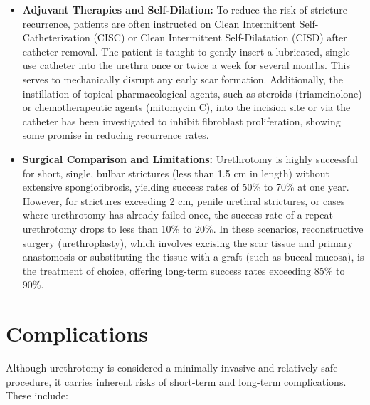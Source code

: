 \begin{itemize}
  \item \textbf{Adjuvant Therapies and Self-Dilation:} To reduce the risk of stricture recurrence, patients are often instructed on Clean Intermittent Self-Catheterization (CISC) or Clean Intermittent Self-Dilatation (CISD) after catheter removal. The patient is taught to gently insert a lubricated, single-use catheter into the urethra once or twice a week for several months. This serves to mechanically disrupt any early scar formation. Additionally, the instillation of topical pharmacological agents, such as steroids (triamcinolone) or chemotherapeutic agents (mitomycin C), into the incision site or via the catheter has been investigated to inhibit fibroblast proliferation, showing some promise in reducing recurrence rates.
  \item \textbf{Surgical Comparison and Limitations:} Urethrotomy is highly successful for short, single, bulbar strictures (less than 1.5 cm in length) without extensive spongiofibrosis, yielding success rates of 50\% to 70\% at one year. However, for strictures exceeding 2 cm, penile urethral strictures, or cases where urethrotomy has already failed once, the success rate of a repeat urethrotomy drops to less than 10\% to 20\%. In these scenarios, reconstructive surgery (urethroplasty), which involves excising the scar tissue and primary anastomosis or substituting the tissue with a graft (such as buccal mucosa), is the treatment of choice, offering long-term success rates exceeding 85\% to 90\%.
\end{itemize}

\section*{Complications}
Although urethrotomy is considered a minimally invasive and relatively safe procedure, it carries inherent risks of short-term and long-term complications. These include:

